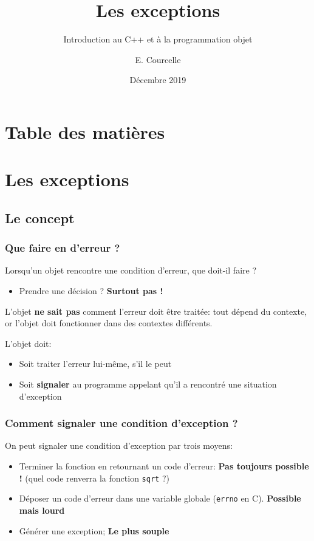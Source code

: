 \documentclass{beamer}
\title{Les exceptions}
\subtitle{Introduction au C++ et à la programmation objet}
\author{E. Courcelle}\institute{CALMIP, URA 3667}
\date{Décembre 2019}
\begin{document}
\begin{frame}
\titlepage
\end{frame}

\section*{Table des matières}
\begin{frame}
\tableofcontents
\end{frame}


\section{Les exceptions}

\subsection{Le concept}

\begin{frame}[fragile=singleslide,shrink=20]
\frametitle {Que faire en d'erreur ?}

Lorsqu'un objet rencontre une condition d'erreur, que doit-il faire ?
\begin{itemize}
\item{Prendre une décision ? \textbf{Surtout pas !}}
\end{itemize}

L'objet \textbf{ne sait pas} comment l'erreur doit être traitée: tout dépend du contexte, or l'objet doit fonctionner
dans des contextes différents.

L'objet doit:
\begin{itemize}
\item{Soit traiter l'erreur lui-même, s'il le peut}
\item{Soit \textbf{signaler } au programme appelant qu'il a rencontré une situation d'exception}
\end{itemize}
\end{frame}

\begin{frame}[fragile=singleslide,shrink=20]
\frametitle {Comment signaler une condition d'exception ?}

On peut signaler une condition d'exception par trois moyens:
\begin{itemize}
\item{Terminer la fonction en retournant un code d'erreur: \textbf{Pas toujours possible !} (quel code renverra la fonction \texttt{sqrt} ?)}
\item{Déposer un code d'erreur dans une variable globale (\texttt{errno} en C). \textbf{Possible mais lourd}}
\item{Générer une exception; \textbf{Le plus souple}}
\end{itemize}

\end{frame}
\end{document}
